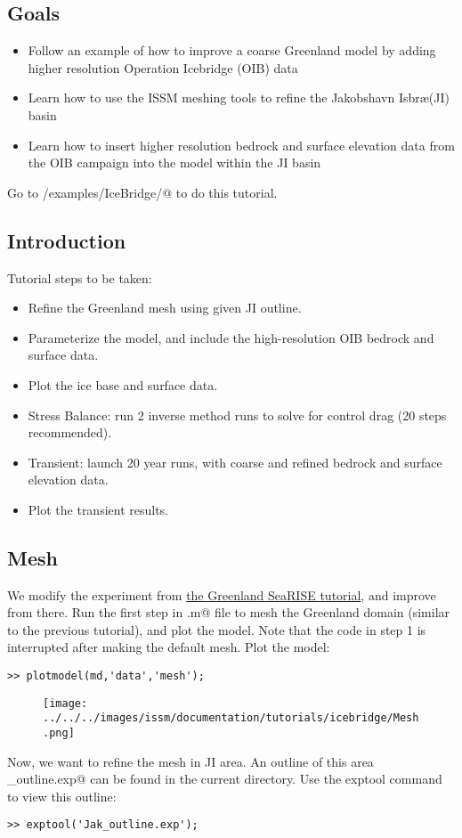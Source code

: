 \subsection{Goals} %
\begin{itemize}
	\item Follow an example of how to improve a coarse Greenland model by adding higher resolution Operation Icebridge (OIB) data
	\item Learn how to use the ISSM meshing tools to refine the Jakobshavn Isbr\ae (JI) basin
	\item Learn how to insert higher resolution bedrock and surface elevation data from the OIB campaign into the model within the JI basin
\end{itemize}

Go to \verb@trunk/examples/IceBridge/@ to do this tutorial.

\subsection{Introduction}%
Tutorial steps to be taken:
\begin{itemize}
	\item Refine the Greenland mesh using given JI outline.
	\item Parameterize the model, and include the high-resolution OIB bedrock and surface data.
	\item Plot the ice base and surface data.
	\item Stress Balance: run 2 inverse method runs to solve for control drag (20 steps recommended).
	\item Transient: launch 20 year runs, with coarse and refined bedrock and surface elevation data.
	\item Plot the transient results.
\end{itemize}
\subsection{Mesh} %
We modify the experiment from \href{../greenland}{the Greenland SeaRISE tutorial}, and improve from there. Run the first step in \verb@runme.m@ file to mesh the Greenland domain (similar to the previous tutorial), and plot the model. Note that the code in step 1 is interrupted after making the default mesh. Plot the model:
\begin{verbatim}>> plotmodel(md,'data','mesh');\end{verbatim}
\begin{figure}[H]
	\begin{center}
		\texttt{[image: ../../../images/issm/documentation/tutorials/icebridge/Mesh.png]}
	\end{center}
\end{figure}
Now, we want to refine the mesh in JI area. An outline of this area \verb@Jak_outline.exp@ can be found in the current directory. Use the exptool command to view this outline:
\begin{verbatim}>> exptool('Jak_outline.exp');\end{verbatim}

